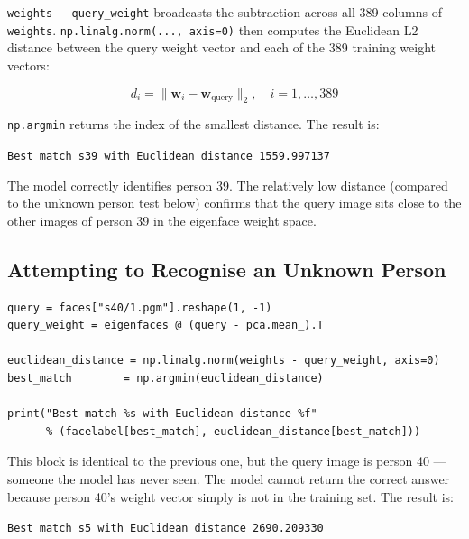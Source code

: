 \documentclass[12pt,a4paper]{article}
\begin{document}
\texttt{weights - query\_weight} broadcasts the subtraction across all 389
columns of \texttt{weights}. \texttt{np.linalg.norm(..., axis=0)} then
computes the Euclidean L2 distance between the query weight vector and each
of the 389 training weight vectors:

\[
d_i = \| \mathbf{w}_i - \mathbf{w}_{\text{query}} \|_2, \quad i = 1, \ldots, 389
\]

\texttt{np.argmin} returns the index of the smallest distance.
The result is:

\begin{center}
  \texttt{Best match s39 with Euclidean distance 1559.997137}
\end{center}

The model correctly identifies person 39. The relatively low distance
(compared to the unknown person test below) confirms that the query image
sits close to the other images of person 39 in the eigenface weight space.

\subsection{Attempting to Recognise an Unknown Person}

\vspace{0.5em}
\begin{minipage}{\linewidth}
\begin{lstlisting}[caption={Query with an image from a class never seen during training}]
query = faces["s40/1.pgm"].reshape(1, -1)
query_weight = eigenfaces @ (query - pca.mean_).T

euclidean_distance = np.linalg.norm(weights - query_weight, axis=0)
best_match        = np.argmin(euclidean_distance)

print("Best match %s with Euclidean distance %f"
      % (facelabel[best_match], euclidean_distance[best_match]))
\end{lstlisting}
\end{minipage}

This block is identical to the previous one, but the query image is person 40 ---
someone the model has never seen. The model cannot return the correct answer
because person 40's weight vector simply is not in the training set. The
result is:

\begin{center}
  \texttt{Best match s5 with Euclidean distance 2690.209330}
\end{center}
\end{document}
